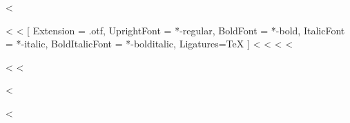 <%
\usepackage[no-math]{fontspec}
  <%
\setmainfont{Arial}
  <%
\setmainfont{texgyretermes}[
  Extension = .otf,
  UprightFont = *-regular,
  BoldFont = *-bold,
  ItalicFont = *-italic,
  BoldItalicFont = *-bolditalic,
  Ligatures=TeX
]
\setsansfont[Scale=.9]{TeX Gyre Heros Regular}
\setmonofont[StylisticSet={1,3},Scale=.9]{inconsolata}
\RequirePackage{newtxmath}
  <%
  <%
<%
  <%
\usepackage[scaled=.95]{helvet}
  <%
\RequirePackage{newtxtext}
\RequirePackage{newtxmath}
\RequirePackage[zerostyle=b,scaled=.9]{newtxtt}
\RequirePackage[varl,scaled=.9]{inconsolata}
  <%
\usepackage[%
    rm={oldstyle=false,proportional=true},%
    sf={oldstyle=false,proportional=true},%
    tt={oldstyle=false,proportional=true,variable=true},%
    qt=false%
]{cfr-lm}
<%
\usepackage[T1]{fontenc}
<%

